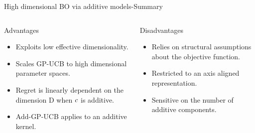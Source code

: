 \begin{frame}{High dimensional BO via additive models-Summary}
\begin{columns}[T] %
\begin{column}{.48\textwidth}


    \begin{block}{Advantages}
    \begin{itemize}
    	\item Exploits low effective dimensionality. 
    	\pause
    	\item Scales GP-UCB to high dimensional parameter spaces.
    	\pause
    	\item Regret is linearly dependent on the dimension D when $c$ is additive.
    	\pause
    	\item Add-GP-UCB applies to an additive kernel.
    \end{itemize}
    \end{block}
\pause
\end{column}%

\hfill%

\begin{column}{.48\textwidth}

    \begin{block}{Disadvantages}
    \begin{itemize}
    	\item Relies on structural assumptions about the objective function.
    	\pause
    	\item Restricted to an axis aligned representation.
    	\pause
    	\item Sensitive on the number of additive components.
    \end{itemize}
\end{block}

\end{column}
\end{columns}   
\end{frame}

